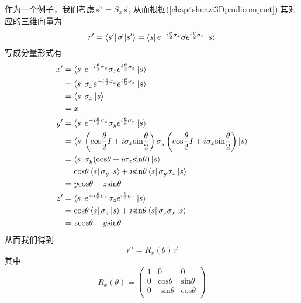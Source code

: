 作为一个例子，我们考虑$\vec{s}'=S_{x}\vec{s}$,
从而根据(\ref{chap4shuazi3Dpaulicompact}),其对应的三维向量为
\begin{equation}
    \vec{r}'=\bra{s'}\vec{\sigma}\ket{s'}=\bra{s}e^{-i\frac{\theta}{2}\sigma_{x}}\vec{\sigma}e^{i\frac{\theta}{2}\sigma_{x}}\ket{s}
\end{equation}
写成分量形式有
\begin{equation}
    \begin{aligned}
        x'&=\bra{s}e^{-i\frac{\theta}{2}\sigma_{x}}\sigma_{x}e^{i\frac{\theta}{2}\sigma_{x}}\ket{s}\\
        &=\bra{s}\sigma_{x}e^{-i\frac{\theta}{2}\sigma_{x}}e^{i\frac{\theta}{2}\sigma_{x}}\ket{s}\\
        &=\bra{s}\sigma_{x}\ket{s}\\
        &=x\\
        y'&=\bra{s}e^{-i\frac{\theta}{2}\sigma_{x}}\sigma_{y}e^{i\frac{\theta}{2}\sigma_{x}}\ket{s}\\
        &=\bra{s}\left(\text{cos}\frac{\theta}{2}I+i\sigma_{x}\text{sin}\frac{\theta}{2}\right)\sigma_{y}\left({\rm cos}\frac{\theta}{2}I+i\sigma_{x}{\rm sin}\frac{\theta}{2}\right)\ket{s}\\
        &=\bra{s}\sigma_{y}(\text{cos}\theta+i\sigma_{x}\text{sin}\theta)\ket{s}\\
        &=\text{cos}\theta\bra{s}\sigma_{y}\ket{s}+i\text{sin}\theta\bra{s}\sigma_{y}\sigma_{x}\ket{s}\\
        &=y\text{cos}\theta+z\text{sin}\theta \\
        z'&=\bra{s}e^{-i\frac{\theta}{2}\sigma_{x}}\sigma_{z}e^{i\frac{\theta}{2}\sigma_{x}}\ket{s}\\
        &=\text{cos}\theta\bra{s}\sigma_{z}\ket{s}+i\text{sin}\theta\bra{s}\sigma_{z}\sigma_{x}\ket{s}\\
         &=z\text{cos}\theta-y\text{sin}\theta \\
    \end{aligned}
\end{equation}
从而我们得到
\begin{equation}
    \vec{r}'=R_{x}\left(\theta\right)\vec{r}
\end{equation}
其中
\begin{equation}
    R_{x}\left(\theta\right)=\left(
    \begin{array}{ccc}
         1&0&0  \\
         0&\text{cos}\theta& \text{sin}\theta\\
          0&\text{-sin}\theta& \text{cos}\theta\\
    \end{array}
    \right)
\end{equation}
